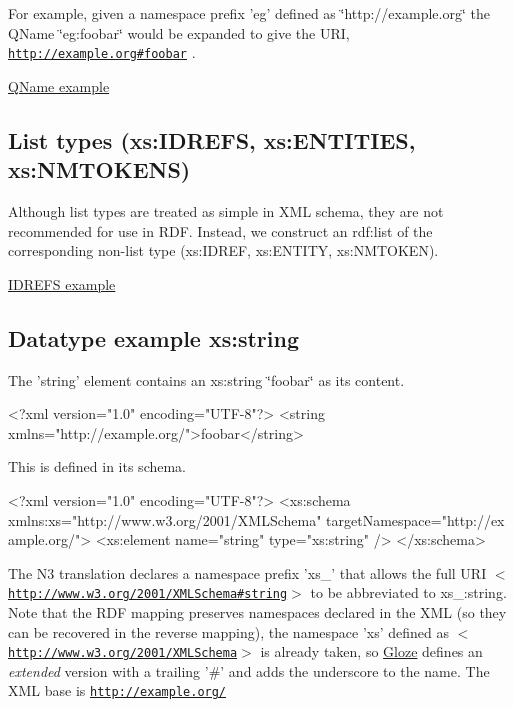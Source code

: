 For example, given a namespace prefix 'eg' defined as \char`\"{}http://example.org\char`\"{} the QName \char`\"{}eg:foobar\char`\"{} would be expanded to give the URI, {\ttfamily \href{http://example.org#foobar}{\tt http://example.org\#foobar}} .

\hyperlink{elementqname}{QName example}\hypertarget{datatypes_listTypes}{}\subsection{List types (xs:IDREFS, xs:ENTITIES, xs:NMTOKENS)}\label{datatypes_listTypes}
Although list types are treated as simple in XML schema, they are not recommended for use in RDF. Instead, we construct an rdf:list of the corresponding non-\/list type (xs:IDREF, xs:ENTITY, xs:NMTOKEN).

\hyperlink{elementidrefs}{IDREFS example} \hypertarget{elementString}{}\subsection{Datatype example xs:string}\label{elementString}
The 'string' element contains an xs:string \char`\"{}foobar\char`\"{} as its content.


\begin{DoxyCodeInclude}
<?xml version="1.0" encoding="UTF-8"?>
<string xmlns="http://example.org/">foobar</string>
\end{DoxyCodeInclude}


This is defined in its schema.


\begin{DoxyCodeInclude}
<?xml version="1.0" encoding="UTF-8"?>
<xs:schema xmlns:xs="http://www.w3.org/2001/XMLSchema" targetNamespace="http://ex
      ample.org/">
        <xs:element name="string" type="xs:string" />
</xs:schema>
\end{DoxyCodeInclude}


The N3 translation declares a namespace prefix 'xs\_\-' that allows the full URI $<$\href{http://www.w3.org/2001/XMLSchema#string}{\tt http://www.w3.org/2001/XMLSchema\#string}$>$ to be abbreviated to xs\_\-:string. Note that the RDF mapping preserves namespaces declared in the XML (so they can be recovered in the reverse mapping), the namespace 'xs' defined as $<$\href{http://www.w3.org/2001/XMLSchema}{\tt http://www.w3.org/2001/XMLSchema}$>$ is already taken, so \hyperlink{classcom_1_1hp_1_1gloze_1_1_gloze}{Gloze} defines an {\itshape extended\/} version with a trailing '\#' and adds the underscore to the name. The XML base is \href{http://example.org/}{\tt http://example.org/}


